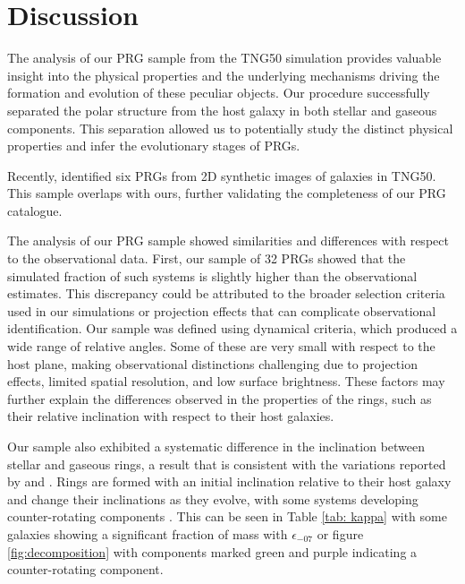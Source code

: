 \documentclass[fleqn,usenatbib]{mnras}
\begin{document}
\section{Discussion} \label{sec:discussion}

The analysis of our PRG sample from the TNG50 simulation provides valuable insight into the physical properties and the underlying mechanisms driving the formation and evolution of these peculiar objects. 
Our procedure successfully separated the polar structure from the host galaxy in both stellar and gaseous components. This separation allowed us to potentially study the distinct physical properties and infer the evolutionary stages of PRGs. 

Recently, \cite{2023_Smirnov} identified six PRGs from 2D synthetic images of galaxies in TNG50. This sample overlaps with ours, further validating the completeness of our PRG catalogue. 

The analysis of our PRG sample showed similarities and differences with respect to the observational data. First, our sample of 32 PRGs showed that the simulated fraction of such systems is slightly higher than the observational estimates. This discrepancy could be attributed to the broader selection criteria used in our simulations or projection effects that can complicate observational identification. Our sample was defined using dynamical criteria, which produced a wide range of relative angles. Some of these are very small with respect to the host plane, making observational distinctions challenging due to projection effects, limited spatial resolution, and low surface brightness. These factors may further explain the differences observed in the properties of the rings, such as their relative inclination with respect to their host galaxies.

Our sample also exhibited a systematic difference in the inclination between stellar and gaseous rings, a result that is consistent with the variations reported by \citet{2023_Smirnov} and \citet{2020_Khoperskov}. Rings are formed with an initial inclination relative to their host galaxy and change their inclinations as they evolve, with some systems developing counter-rotating components \citep{Lopez-Castillo+2025}. This can be seen in Table \ref{tab: kappa} with some galaxies showing a significant fraction of mass with $\epsilon_{-07}$ or figure \ref{fig:decomposition} with components marked green and purple indicating a counter-rotating component.
\end{document}
